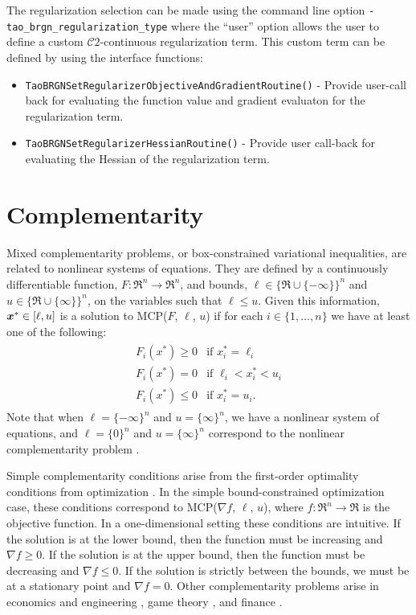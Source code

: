 The regularization selection can be made using the command line option \texttt{-tao\_brgn\_regularization\_type} 
{\tt <l2pure, l2prox, l1dict, user>} where the ``user'' option allows the user to define a custom 
$\mathcal{C}2$-continuous regularization term. This custom term can be defined by using the 
interface functions:
\begin{itemize} 
  \item {\tt TaoBRGNSetRegularizerObjectiveAndGradientRoutine()} - Provide user-call back for 
        evaluating the function value and gradient evaluaton for the regularization term.
  \item {\tt TaoBRGNSetRegularizerHessianRoutine()} - Provide user call-back for evaluating the 
        Hessian of the regularization term.
\end{itemize}

\section{Complementarity}
\label{sec:complementarity}

Mixed complementarity problems, or box-constrained variational inequalities,
are related to nonlinear systems of equations.  They are defined by a 
continuously differentiable function,
$F:\Re^n \to \Re^n$, and bounds, $\ell \in \{\Re \cup \{-\infty\}\}^n$ 
and $u \in \{\Re \cup \{\infty\}\}^n$, on the variables such that 
$\ell \leq u$.  Given this information, $\mbox{\boldmath \(x\)}^* \in [\ell,u]$ is a solution to 
MCP($F$, $\ell$, $u$) if for each $i \in \{1, \ldots, n\}$ we have at
least one of the following:
\begin{eqnarray*}
\begin{array}{ll}
F_i(x^*) \geq 0 & \mbox{if } x^*_i = \ell_i \\
F_i(x^*) = 0 & \mbox{if } \ell_i < x^*_i < u_i \\
F_i(x^*) \leq 0 & \mbox{if } x^*_i = u_i.
\end{array}
\end{eqnarray*}
Note that when $\ell = \{-\infty\}^n$ and $u = \{\infty\}^n$, we have a 
nonlinear system of equations, and $\ell = \{0\}^n$ and $u = \{\infty\}^n$ 
correspond to the nonlinear complementarity problem \cite{cottle:nonlinear}.

Simple complementarity conditions arise from the first-order optimality 
conditions from optimization \cite{karush:minima, kuhn.tucker:nonlinear}.  
In the simple bound-constrained optimization case, these conditions 
correspond to MCP($\nabla f$, $\ell$, $u$), where $f: \Re^n \to \Re$ 
is the objective function.  In a one-dimensional setting these conditions 
are intuitive.  If the solution is at the lower bound, then the function must 
be increasing and $\nabla f \geq 0$.  If the solution is at the 
upper bound, then the function must be decreasing and $\nabla f \leq 0$.  
If the solution 
is strictly between the bounds, we must be at a stationary point and 
$\nabla f = 0$.  Other complementarity problems arise in economics and 
engineering \cite{ferris.pang:engineering}, game 
theory \cite{nash:equilibrium}, and finance \cite{huang.pang:option}.

